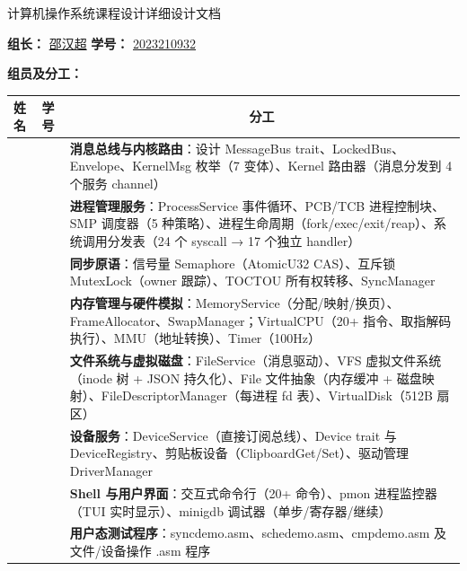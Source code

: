 \documentclass[UTF8,a4paper,12pt]{ctexart}
\begin{document}
\begin{center}
    {\heiti 计算机操作系统课程设计详细设计文档}
\end{center}

\vspace{2em}

\noindent\textbf{组长：} \underline{邵汉超} \quad
\textbf{学号：} \underline{2023210932}

\vspace{1em}

\noindent\textbf{组员及分工：}

\vspace{0.5em}

\begin{center}
\begin{tabularx}{0.95\textwidth}{|>{\centering\arraybackslash}p{2.5cm}|>{\centering\arraybackslash}p{3cm}|X|}
\hline
\textbf{姓名} & \textbf{学号} & \multicolumn{1}{c|}{\textbf{分工}} \\
\hline
\multirow{6}{*}{邵汉超} & \multirow{6}{*}{2023210932} & 
\textbf{消息总线与内核路由}：设计 MessageBus trait、LockedBus、Envelope、KernelMsg 枚举（7 变体）、Kernel 路由器（消息分发到 4 个服务 channel）\\
\cline{3-3}
 & & \textbf{进程管理服务}：ProcessService 事件循环、PCB/TCB 进程控制块、SMP 调度器（5 种策略）、进程生命周期（fork/exec/exit/reap）、系统调用分发表（24 个 syscall → 17 个独立 handler）\\
\cline{3-3}
 & & \textbf{同步原语}：信号量 Semaphore（AtomicU32 CAS）、互斥锁 MutexLock（owner 跟踪）、TOCTOU 所有权转移、SyncManager\\
\cline{3-3}
 & & \textbf{内存管理与硬件模拟}：MemoryService（分配/映射/换页）、FrameAllocator、SwapManager；VirtualCPU（20+ 指令、取指解码执行）、MMU（地址转换）、Timer（100Hz）\\
\hline
\multirow{4}{*}{唐博艺} & \multirow{4}{*}{2023210942} & 
\textbf{文件系统与虚拟磁盘}：FileService（消息驱动）、VFS 虚拟文件系统（inode 树 + JSON 持久化）、File 文件抽象（内存缓冲 + 磁盘映射）、FileDescriptorManager（每进程 fd 表）、VirtualDisk（512B 扇区）\\
\cline{3-3}
 & & \textbf{设备服务}：DeviceService（直接订阅总线）、Device trait 与 DeviceRegistry、剪贴板设备（ClipboardGet/Set）、驱动管理 DriverManager\\
\cline{3-3}
 & & \textbf{Shell 与用户界面}：交互式命令行（20+ 命令）、pmon 进程监控器（TUI 实时显示）、minigdb 调试器（单步/寄存器/继续）\\
\cline{3-3}
 & & \textbf{用户态测试程序}：syncdemo.asm、schedemo.asm、cmpdemo.asm 及文件/设备操作 .asm 程序\\
\hline
\end{tabularx}
\end{center}
\end{document}
